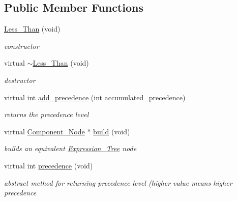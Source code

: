 \subsection*{Public Member Functions}
\begin{DoxyCompactItemize}
\item 
\hyperlink{classMadara_1_1Expression__Tree_1_1Less__Than_a0af94d9f6a19ee50bc09a6b4fe49e6ab}{Less\_\-Than} (void)
\begin{DoxyCompactList}\small\item\em constructor \item\end{DoxyCompactList}\item 
virtual \hyperlink{classMadara_1_1Expression__Tree_1_1Less__Than_aa1e433bfd7ab42e0c762f1a991cb4802}{$\sim$Less\_\-Than} (void)
\begin{DoxyCompactList}\small\item\em destructor \item\end{DoxyCompactList}\item 
virtual int \hyperlink{classMadara_1_1Expression__Tree_1_1Less__Than_a63243f8d4fa63a14f03f6031ede8669d}{add\_\-precedence} (int accumulated\_\-precedence)
\begin{DoxyCompactList}\small\item\em returns the precedence level \item\end{DoxyCompactList}\item 
virtual \hyperlink{classMadara_1_1Expression__Tree_1_1Component__Node}{Component\_\-Node} $\ast$ \hyperlink{classMadara_1_1Expression__Tree_1_1Less__Than_af2efb493fb5f9354e08cefaeb0cd3692}{build} (void)
\begin{DoxyCompactList}\small\item\em builds an equivalent \hyperlink{classMadara_1_1Expression__Tree_1_1Expression__Tree}{Expression\_\-Tree} node \item\end{DoxyCompactList}\item 
virtual int \hyperlink{classMadara_1_1Expression__Tree_1_1Symbol_ac060dedb8d16864591b259df375109b3}{precedence} (void)
\begin{DoxyCompactList}\small\item\em abstract method for returning precedence level (higher value means higher precedence \item\end{DoxyCompactList}\end{DoxyCompactItemize}
